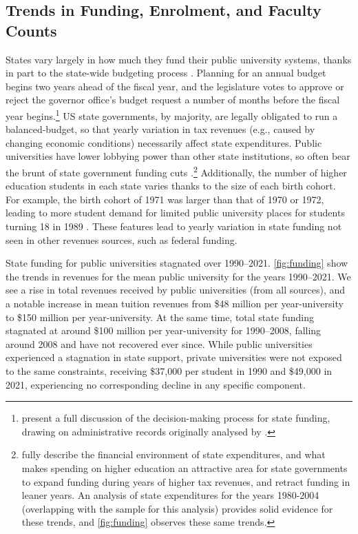 \subsection{Trends in Funding, Enrolment, and Faculty Counts}
\label{sec:trends}

States vary largely in how much they fund their public university systems, thanks in part to the state-wide budgeting process \citep{NBERw23736}.
Planning for an annual budget begins two years ahead of the fiscal year, and the legislature votes to approve or reject the governor office's budget request a number of months before the fiscal year begins.\footnote{
    \cite{NBERw23736} present a full discussion of the decision-making process for state funding, drawing on administrative records originally analysed by \cite{parmley2009state}.
}
US state governments, by majority, are legally obligated to run a balanced-budget, so that yearly variation in tax revenues (e.g., caused by changing economic conditions) necessarily affect state expenditures.
Public universities have lower lobbying power than other state institutions, so often bear the brunt of state government funding cuts \citep{delaney2011state}.\footnote{
    \cite{delaney2011state} fully describe the financial environment of state expenditures, and what makes spending on higher education an attractive area for state governments to expand funding during years of higher tax revenues, and retract funding in leaner years.
    An analysis of state expenditures for the years 1980-2004 (overlapping with the sample for this analysis) provides solid evidence for these trends, and \autoref{fig:funding} observes these same trends.
}
Additionally, the number of higher education students in each state varies thanks to the size of each birth cohort.
For example, the birth cohort of 1971 was larger than that of 1970 or 1972, leading to more student demand for limited public university places for students turning 18 in 1989 \citep{bound2007cohort}.
These features lead to yearly variation in state funding not seen in other revenues sources, such as federal funding.

State funding for public universities stagnated over 1990--2021.
\autoref{fig:funding} show the trends in revenues for the mean public university for the years 1990--2021.
We see a rise in total revenues received by public universities (from all sources), and a notable increase in mean tuition revenues from \$48 million per year-university to \$150 million per year-university.
At the same time, total state funding stagnated at around \$100 million per year-university for 1990--2008, falling around 2008 and have not recovered ever since.
While public universities experienced a stagnation in state support, private universities were not exposed to the same constraints, receiving \$37,000 per student in 1990 and \$49,000 in 2021, experiencing no corresponding decline in any specific component.


